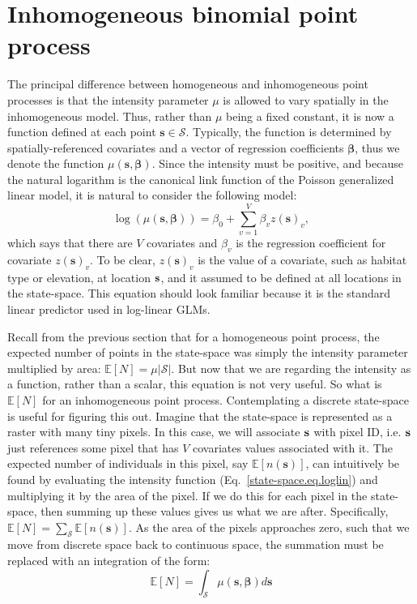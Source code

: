 \section{Inhomogeneous binomial point process}

The principal difference between homogeneous and inhomogeneous point
processes is that the intensity parameter $\mu$ is allowed to vary spatially
in the inhomogeneous model. Thus, rather than $\mu$ being a fixed constant,
it is now a function defined at each point $\mathbf{s} \in
\mathcal{S}$. Typically, the function is determined by
spatially-referenced covariates and a vector of regression
coefficients $\bm \beta$, thus we denote the function $\mu(\mathbf{s},
\bm{\beta})$. Since the intensity must be %
positive, and because the natural logarithm is the canonical link
function of the Poisson generalized linear model, it is natural to
consider the following model:
\begin{equation}
  \log(\mu(\mathbf{s}, {\bm \beta})) = \beta_0 + \sum_{v=1}^V \beta_v z(\mathbf{s})_v, %
  \label{state-space.eq.loglin}
\end{equation}
which says that there are $V$ covariates and $\beta_v$ is the
regression coefficient for covariate
$z(\mathbf{s})_v$. To be clear, $z(\mathbf{s})_v$ is the value of a covariate, such as
habitat type or elevation, at location $\bf s$, and it assumed to be
defined at all locations in the state-space. This equation should look
familiar because it is the standard linear predictor used in log-linear
GLMs.

Recall from the previous section that for a homogeneous point process,
the expected number of points in the state-space was simply the
intensity parameter multiplied by area: $\mathbb{E}[N] =
\mu|\mathcal{S}|$. But now that we are regarding the intensity as a
function, rather than a scalar, this equation is not very useful. So
what is $\mathbb{E}[N]$ for an inhomogeneous point process.
Contemplating a discrete state-space is useful for figuring this
out. Imagine that the state-space is represented as a raster with many
tiny pixels. In this case, we will associate
$\bf s$ with pixel ID, i.e. $\bf s$ just references some pixel that
has $V$ covariates values associated with it. The expected number of
individuals in this pixel, say $\mathbb{E}[n(\mathbf{s})]$, can intuitively be
found by evaluating the intensity function
(Eq.~\ref{state-space.eq.loglin}) and multiplying it by the area of
the pixel. If we do this for each pixel in the state-space, then
summing up these values gives us what we are after. Specifically,
$\mathbb{E}[N] = \sum_{\mathcal{S}} \mathbb{E}[n(\mathbf{s})]$. As the
area of the pixels approaches zero, such that we move from discrete
space back to continuous space, the summation must be replaced
with an integration of the form:
\[
\mathbb{E}[N] = \int_{\mathcal{S}} \mu(\mathbf{s}, {\bm \beta}) d\mathbf{s}
\]

